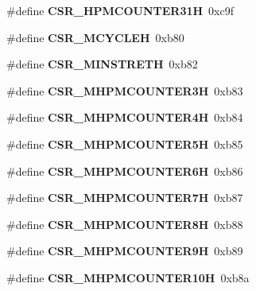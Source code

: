\begin{DoxyCompactItemize}
\#define {\bfseries C\+S\+R\+\_\+\+H\+P\+M\+C\+O\+U\+N\+T\+E\+R31H}~0xc9f
\item 
\mbox{\label{riscv-utility_8h_ae3368bea588a2fcdf2e7d24707ef4dda}} 
\#define {\bfseries C\+S\+R\+\_\+\+M\+C\+Y\+C\+L\+EH}~0xb80
\item 
\mbox{\label{riscv-utility_8h_aa59d1f570770dc3be6cd493cbb5a12e4}} 
\#define {\bfseries C\+S\+R\+\_\+\+M\+I\+N\+S\+T\+R\+E\+TH}~0xb82
\item 
\mbox{\label{riscv-utility_8h_a723ef168d1e7ffe66875303075956376}} 
\#define {\bfseries C\+S\+R\+\_\+\+M\+H\+P\+M\+C\+O\+U\+N\+T\+E\+R3H}~0xb83
\item 
\mbox{\label{riscv-utility_8h_ad31a1402ff7146c42b2018c35f91fff8}} 
\#define {\bfseries C\+S\+R\+\_\+\+M\+H\+P\+M\+C\+O\+U\+N\+T\+E\+R4H}~0xb84
\item 
\mbox{\label{riscv-utility_8h_a60c30dce15b7a2be53a146006b555e89}} 
\#define {\bfseries C\+S\+R\+\_\+\+M\+H\+P\+M\+C\+O\+U\+N\+T\+E\+R5H}~0xb85
\item 
\mbox{\label{riscv-utility_8h_a9e13742a1cdd2859c114d53e957d1479}} 
\#define {\bfseries C\+S\+R\+\_\+\+M\+H\+P\+M\+C\+O\+U\+N\+T\+E\+R6H}~0xb86
\item 
\mbox{\label{riscv-utility_8h_a12c3fe1c5311dfddb62fc22f974979a5}} 
\#define {\bfseries C\+S\+R\+\_\+\+M\+H\+P\+M\+C\+O\+U\+N\+T\+E\+R7H}~0xb87
\item 
\mbox{\label{riscv-utility_8h_a70fcf0b335621e50d6f717658c502ab7}} 
\#define {\bfseries C\+S\+R\+\_\+\+M\+H\+P\+M\+C\+O\+U\+N\+T\+E\+R8H}~0xb88
\item 
\mbox{\label{riscv-utility_8h_a33e415199dbfe9bceb11b02fd05f05e2}} 
\#define {\bfseries C\+S\+R\+\_\+\+M\+H\+P\+M\+C\+O\+U\+N\+T\+E\+R9H}~0xb89
\item 
\mbox{\label{riscv-utility_8h_a3f9e5f23fba4ba95afe9062e6d0223a7}} 
\#define {\bfseries C\+S\+R\+\_\+\+M\+H\+P\+M\+C\+O\+U\+N\+T\+E\+R10H}~0xb8a
\item 

\end{DoxyCompactItemize}
